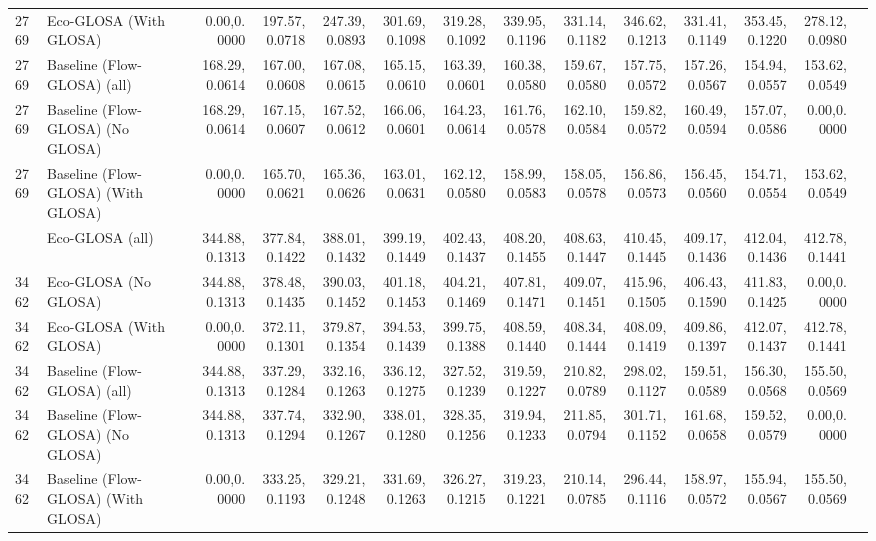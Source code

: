 \begin{table}[ht]
{\begin{tabular}{llrrrrrrrrrrrr}
      2769 & Eco-GLOSA (With GLOSA)            &   0.00,0.0000 & 197.57,0.0718 & 247.39,0.0893 & 301.69,0.1098 & 319.28,0.1092 & 339.95,0.1196 & 331.14,0.1182 & 346.62,0.1213 & 331.41,0.1149 & 353.45,0.1220 & 278.12,0.0980 \\
      2769 & Baseline (Flow-GLOSA) (all)       & 168.29,0.0614 & 167.00,0.0608 & 167.08,0.0615 & 165.15,0.0610 & 163.39,0.0601 & 160.38,0.0580 & 159.67,0.0580 & 157.75,0.0572 & 157.26,0.0567 & 154.94,0.0557 & 153.62,0.0549 \\
      2769 & Baseline (Flow-GLOSA) (No GLOSA)  & 168.29,0.0614 & 167.15,0.0607 & 167.52,0.0612 & 166.06,0.0601 & 164.23,0.0614 & 161.76,0.0578 & 162.10,0.0584 & 159.82,0.0572 & 160.49,0.0594 & 157.07,0.0586 &   0.00,0.0000 \\
      2769 & Baseline (Flow-GLOSA) (With GLOSA)&   0.00,0.0000 & 165.70,0.0621 & 165.36,0.0626 & 163.01,0.0631 & 162.12,0.0580 & 158.99,0.0583 & 158.05,0.0578 & 156.86,0.0573 & 156.45,0.0560 & 154.71,0.0554 & 153.62,0.0549 \\
      \addlinespace
      3462 & Eco-GLOSA (all)                   & 344.88,0.1313 & 377.84,0.1422 & 388.01,0.1432 & 399.19,0.1449 & 402.43,0.1437 & 408.20,0.1455 & 408.63,0.1447 & 410.45,0.1445 & 409.17,0.1436 & 412.04,0.1436 & 412.78,0.1441 \\
      3462 & Eco-GLOSA (No GLOSA)              & 344.88,0.1313 & 378.48,0.1435 & 390.03,0.1452 & 401.18,0.1453 & 404.21,0.1469 & 407.81,0.1471 & 409.07,0.1451 & 415.96,0.1505 & 406.43,0.1590 & 411.83,0.1425 &   0.00,0.0000 \\
      3462 & Eco-GLOSA (With GLOSA)            &   0.00,0.0000 & 372.11,0.1301 & 379.87,0.1354 & 394.53,0.1439 & 399.75,0.1388 & 408.59,0.1440 & 408.34,0.1444 & 408.09,0.1419 & 409.86,0.1397 & 412.07,0.1437 & 412.78,0.1441 \\
      3462 & Baseline (Flow-GLOSA) (all)       & 344.88,0.1313 & 337.29,0.1284 & 332.16,0.1263 & 336.12,0.1275 & 327.52,0.1239 & 319.59,0.1227 & 210.82,0.0789 & 298.02,0.1127 & 159.51,0.0589 & 156.30,0.0568 & 155.50,0.0569 \\
      3462 & Baseline (Flow-GLOSA) (No GLOSA)  & 344.88,0.1313 & 337.74,0.1294 & 332.90,0.1267 & 338.01,0.1280 & 328.35,0.1256 & 319.94,0.1233 & 211.85,0.0794 & 301.71,0.1152 & 161.68,0.0658 & 159.52,0.0579 &   0.00,0.0000 \\
      3462 & Baseline (Flow-GLOSA) (With GLOSA)&   0.00,0.0000 & 333.25,0.1193 & 329.21,0.1248 & 331.69,0.1263 & 326.27,0.1215 & 319.23,0.1221 & 210.14,0.0785 & 296.44,0.1116 & 158.97,0.0572 & 155.94,0.0567 & 155.50,0.0569 \\
      \bottomrule
    \end{tabular}
  }
\end{table}

